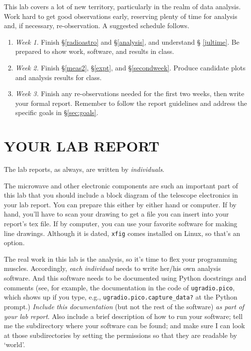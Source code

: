 \documentclass[11pt,preprint]{aastex}
\begin{document}
\noindent
This lab covers a lot of new territory, particularly in the realm of data
analysis. Work hard to get good observations early, reserving plenty of
time for analysis and, if necessary, re-observation. A suggested schedule
follows.
\begin{enumerate}

\item {\it Week 1.}
Finish \S\ref{radioastro} and \S \ref{analysis}, and understand \S
  \ref{jultime}. Be prepared to show work, software, and results in class.

\item {\it Week 2.}
Finish \S \ref{meas2}, \S \ref{expt}, and \S \ref{secondweek}. Produce
candidate plots and analysis results for class.

\item {\it Week 3.} Finish any re-observations needed for the first
two weeks, then write your formal
  report. Remember to follow the report guidelines and address the specific
goals in \S\ref{sec:goals}.

\end{enumerate}

\section{YOUR LAB REPORT}

The lab reports, as always, are written by {\it individuals}. 

The microwave and other electronic components are such an important part of this
lab that you should include a block diagram of the telescope electronics
in your lab report. You can prepare this either by either hand or
computer. If by hand, you'll have to scan your drawing to get a file you can
insert into your report's tex file. If by computer, you can use your
favorite software for making line drawings.  Although it is dated, {\tt xfig}
comes installed on Linux, so that's an option.

The real work in this lab is the analysis, so it's time to 
flex your programming muscles. Accordingly, {\it
  each individual} needs to write her/his own analysis software. And this
software needs to be documented using Python docstrings and comments
(see, for example, the documentation in the code of {\tt ugradio.pico}, which
shows up if you type, e.g., {\tt ugradio.pico.capture\_data?} at the Python prompt.)
{\it Include this
  documentation} (but not the rest of the software) {\it as part of your lab
report}. Also include a brief description of how to run your software;
tell me the subdirectory where your software can be found; and make sure
I can look at those subdirectories by setting the permissions so that
they are readable by `world'. 
\end{document}
